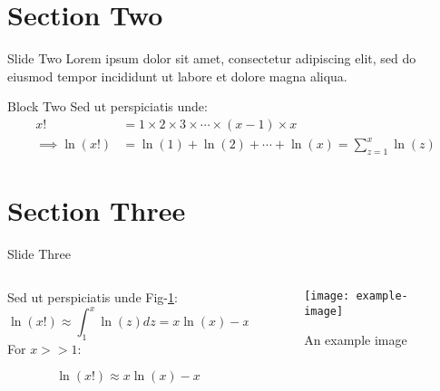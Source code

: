 \documentclass[aspectratio=169]{beamer}  %
\begin{document}

\section{Section Two}
\begin{frame}{Slide Two}
    Lorem ipsum dolor sit amet, consectetur adipiscing elit, sed do eiusmod tempor incididunt ut labore et dolore magna aliqua. 
\begin{block}{Block Two}
  Sed ut perspiciatis unde:
    \begin{align*}
        x! &= 1 \times 2 \times 3 \times \cdots \times (x-1) \times x \\
        \implies \ln(x!) &= \ln(1) + \ln(2) + \cdots + \ln(x) = \displaystyle \sum_{z=1}^x \ln(z)
    \end{align*}
\end{block}
\end{frame}


\section{Section Three}
\begin{framefont}{\footnotesize}
\begin{frame}{Slide Three}
    \begin{columns}
        \begin{column}{0.5\textwidth}
            Sed ut perspiciatis unde Fig-\ref{fig:sample}:
            $$ \ln(x!) \approx \displaystyle \int_1^x \ln(z) dz = x\ln(x) - x + 1$$
            For $x>>1$:
            \begin{block}{}
                $$\ln(x!) \approx x\ln(x) - x$$ 
            \end{block}
        \end{column}
        \begin{column}{0.4\textwidth}  
            \begin{figure}
                \centering
                \texttt{[image: example-image]}
                \caption{An example image}
                \label{fig:sample}
            \end{figure}
        \end{column}
    \end{columns}
\end{frame}
\end{framefont}
\end{document}
